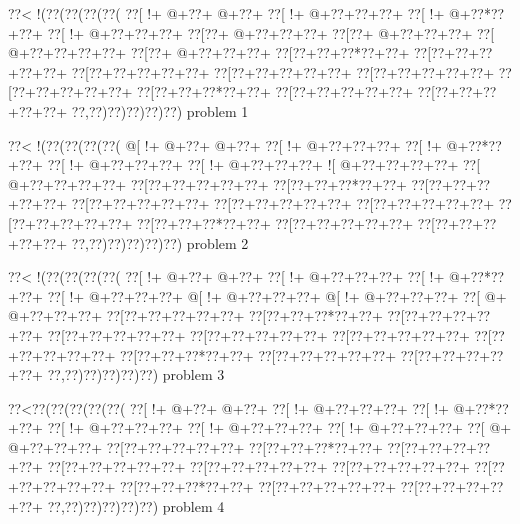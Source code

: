 \vbox{\vbox{\goo
\0??<\- !(\0??(\0??(\0??(\0??(
\0??[\- !+\- @+\0??+\- @+\0??+
\0??[\- !+\- @+\0??+\0??+\0??+
\0??[\- !+\- @+\0??*\0??+\0??+
\0??[\- !+\- @+\0??+\0??+\0??+
\0??[\0??+\- @+\0??+\0??+\0??+
\0??[\0??+\- @+\0??+\0??+\0??+
\0??[\- @+\0??+\0??+\0??+\0??+
\0??[\0??+\- @+\0??+\0??+\0??+
\0??[\0??+\0??+\0??*\0??+\0??+
\0??[\0??+\0??+\0??+\0??+\0??+
\0??[\0??+\0??+\0??+\0??+\0??+
\0??[\0??+\0??+\0??+\0??+\0??+
\0??[\0??+\0??+\0??+\0??+\0??+
\0??[\0??+\0??+\0??+\0??+\0??+
\0??[\0??+\0??+\0??*\0??+\0??+
\0??[\0??+\0??+\0??+\0??+\0??+
\0??[\0??+\0??+\0??+\0??+\0??+
\0??,\0??)\0??)\0??)\0??)\0??)
}
\hfil problem 1\hfil\break
}

\vbox{\vbox{\goo
\0??<\- !(\0??(\0??(\0??(\0??(
\- @[\- !+\- @+\0??+\- @+\0??+
\0??[\- !+\- @+\0??+\0??+\0??+
\0??[\- !+\- @+\0??*\0??+\0??+
\0??[\- !+\- @+\0??+\0??+\0??+
\0??[\- !+\- @+\0??+\0??+\0??+
\- ![\- @+\0??+\0??+\0??+\0??+
\0??[\- @+\0??+\0??+\0??+\0??+
\0??[\0??+\0??+\0??+\0??+\0??+
\0??[\0??+\0??+\0??*\0??+\0??+
\0??[\0??+\0??+\0??+\0??+\0??+
\0??[\0??+\0??+\0??+\0??+\0??+
\0??[\0??+\0??+\0??+\0??+\0??+
\0??[\0??+\0??+\0??+\0??+\0??+
\0??[\0??+\0??+\0??+\0??+\0??+
\0??[\0??+\0??+\0??*\0??+\0??+
\0??[\0??+\0??+\0??+\0??+\0??+
\0??[\0??+\0??+\0??+\0??+\0??+
\0??,\0??)\0??)\0??)\0??)\0??)
}
\hfil problem 2\hfil\break
}

\vbox{\vbox{\goo
\0??<\- !(\0??(\0??(\0??(\0??(
\0??[\- !+\- @+\0??+\- @+\0??+
\0??[\- !+\- @+\0??+\0??+\0??+
\0??[\- !+\- @+\0??*\0??+\0??+
\0??[\- !+\- @+\0??+\0??+\0??+
\- @[\- !+\- @+\0??+\0??+\0??+
\- @[\- !+\- @+\0??+\0??+\0??+
\0??[\- @+\- @+\0??+\0??+\0??+
\0??[\0??+\0??+\0??+\0??+\0??+
\0??[\0??+\0??+\0??*\0??+\0??+
\0??[\0??+\0??+\0??+\0??+\0??+
\0??[\0??+\0??+\0??+\0??+\0??+
\0??[\0??+\0??+\0??+\0??+\0??+
\0??[\0??+\0??+\0??+\0??+\0??+
\0??[\0??+\0??+\0??+\0??+\0??+
\0??[\0??+\0??+\0??*\0??+\0??+
\0??[\0??+\0??+\0??+\0??+\0??+
\0??[\0??+\0??+\0??+\0??+\0??+
\0??,\0??)\0??)\0??)\0??)\0??)
}
\hfil problem 3\hfil\break
}

\vbox{\vbox{\goo
\0??<\0??(\0??(\0??(\0??(\0??(
\0??[\- !+\- @+\0??+\- @+\0??+
\0??[\- !+\- @+\0??+\0??+\0??+
\0??[\- !+\- @+\0??*\0??+\0??+
\0??[\- !+\- @+\0??+\0??+\0??+
\0??[\- !+\- @+\0??+\0??+\0??+
\0??[\- !+\- @+\0??+\0??+\0??+
\0??[\- @+\- @+\0??+\0??+\0??+
\0??[\0??+\0??+\0??+\0??+\0??+
\0??[\0??+\0??+\0??*\0??+\0??+
\0??[\0??+\0??+\0??+\0??+\0??+
\0??[\0??+\0??+\0??+\0??+\0??+
\0??[\0??+\0??+\0??+\0??+\0??+
\0??[\0??+\0??+\0??+\0??+\0??+
\0??[\0??+\0??+\0??+\0??+\0??+
\0??[\0??+\0??+\0??*\0??+\0??+
\0??[\0??+\0??+\0??+\0??+\0??+
\0??[\0??+\0??+\0??+\0??+\0??+
\0??,\0??)\0??)\0??)\0??)\0??)
}
\hfil problem 4\hfil\break
}

